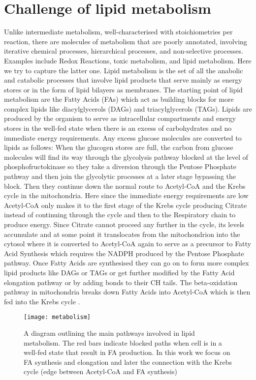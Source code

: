 \section{Challenge of lipid metabolism}
Unlike intermediate metabolism, well-characterised with
stoichiometries per reaction, there are molecules of metabolism that
are poorly annotated, involving iterative chemical processes,
hierarchical processes, and non-selective processes. Examples include
Redox Reactions, toxic metabolism, and lipid metabolism. Here we try to
capture the latter one.
Lipid metabolism is the set of all the anabolic and catabolic
processes that involve lipid products that serve mainly as energy
stores or in the form of lipid bilayers as membranes. The starting
point of lipid metabolism are the Fatty Acids (FAs) which act as building
blocks for more complex lipids like diacylglycerols (DAGs) and
triacylglycerols (TAGs). Lipids are
produced by the organism to serve as intracellular compartments and energy stores in the well-fed state when there is an excess
of carbohydrates and no immediate energy requirements. Any excess
glucose molecules are converted to lipids as follows: When the
glucogen stores are full, the carbon from glucose molecules will find its way through
the glycolysis pathway blocked at the level of phosphofructokinase so
they take a diversion through the Pentose Phosphate pathway and then
join the glycolytic processes at a later stage bypassing the
block. Then they continue down the normal route to Acetyl-CoA and the
Krebs cycle in the mitochondria. Here since the immediate energy requirements
are low Acetyl-CoA only makes it to the first stage of the Krebs cycle
producing Citrate instead of continuing through the cycle and then to
the Respiratory chain to produce energy. Since Citrate cannot proceed any further in the
cycle, its levels accumulate and at some point it translocates from
the mitochondrion into the cytosol where it is converted to Acetyl-CoA
again to serve as a precursor to Fatty Acid Synthesis which requires
the NADPH produced by the Pentose Phosphate pathway. Once Fatty Acids
are synthesised they can go on to form more complex lipid products
like DAGs or
TAGs or get further modified by the Fatty Acid elongation pathway or
by adding bonds to their CH tails. The beta-oxidation pathway in
mitochondria breaks down Fatty Acids into Acetyl-CoA which is then fed
into the Krebs cycle \cite [] {salway2013metabolism}.

\begin{figure}[htbp!]
\centering
\texttt{[image: metabolism]}
\caption[Lipid metabolism and interacting pathways]{A diagram
  outlining the main pathways involved in lipid metabolism. The red
  bars indicate blocked paths when cell is in a well-fed state that
  result in FA production. In this work we focus on FA synthesis and
  elongation and later the connection with the Krebs cycle (edge
  between Acetyl-CoA and FA synthesis)}
\label{fig:lipid_metabolism}
\end{figure}

